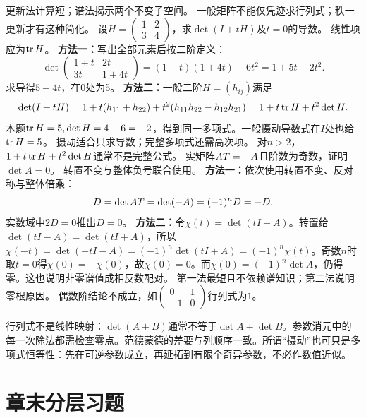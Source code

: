 {更新法计算短；谱法揭示两个不变子空间。}
{一般矩阵不能仅凭迹求行列式；秩一更新才有这种简化。}
{设$H=\begin{pmatrix}1&2\\3&4\end{pmatrix}$，求$\det(I+tH)$及$t=0$的导数。}
{线性项应为$\operatorname{tr} H$。}
{\textbf{方法一：}写出全部元素后按二阶定义：
\[\det\begin{pmatrix}1+t&2t\\3t&1+4t\end{pmatrix}=(1+t)(1+4t)-6t^2=1+5t-2t^2.\]
求导得$5-4t$，在0处为5。
\textbf{方法二：}一般二阶$H=(h_{ij})$满足
\[\det(I+tH)=1+t(h_{11}+h_{22})+t^2(h_{11}h_{22}-h_{12}h_{21})=1+t\operatorname{tr} H+t^2\det H.\]
本题$\operatorname{tr} H=5,\det H=4-6=-2$，得到同一多项式。一般摄动导数式在$I$处也给$\operatorname{tr} H=5$。}
{摄动适合只求导数；完整多项式还需高次项。}
{对$n>2$，$1+t\operatorname{tr} H+t^2\det H$通常不是完整公式。}
{实矩阵$AT=-A$且阶数为奇数，证明$\det A=0$。}
{转置不变与整体负号联合使用。}
{\textbf{方法一：}依次使用转置不变、反对称与整体倍乘：
\[D=\det AT=\det(-A)=(-1)^nD=-D.\]
实数域中$2D=0$推出$D=0$。
\textbf{方法二：}令$\chi(t)=\det(tI-A)$。转置给$\det(tI-A)=\det(tI+A)$，所以$\chi(-t)=\det(-tI-A)=(-1)^n\det(tI+A)=(-1)^n\chi(t)$。奇数$n$时取$t=0$得$\chi(0)=-\chi(0)$，故$\chi(0)=0$。而$\chi(0)=(-1)^n\det A$，仍得零。这也说明非零谱值成相反数配对。}
{第一法最短且不依赖谱知识；第二法说明零根原因。}
{偶数阶结论不成立，如$\begin{pmatrix}0&1\\-1&0\end{pmatrix}$行列式为$1$。}
\begin{warning}
行列式不是线性映射：$\det(A+B)$通常不等于$\det A+\det B$。参数消元中的每一次除法都需检查零点。范德蒙德的差要与列顺序一致。所谓“摄动”也可只是多项式恒等性：先在可逆参数成立，再延拓到有限个奇异参数，不必作数值近似。
\end{warning}
\section*{章末分层习题}
